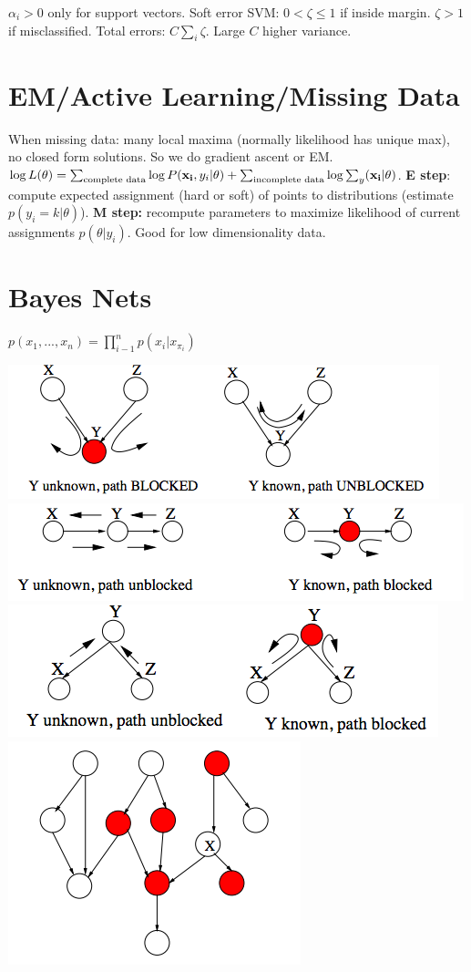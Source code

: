 $\alpha_{i} > 0$ only for support vectors. Soft error SVM: $0 < \zeta \leq 1$ if inside margin. $\zeta > 1$ if misclassified. Total errors: $C \sum_{i} \zeta$. Large $C$ higher variance.

\section{EM/Active Learning/Missing Data}
When missing data: many local maxima (normally likelihood has unique max), no closed form solutions. So we do gradient ascent or EM. $\log L(\theta) = \sum_{\text{complete data}} \log P(\mathbf{x_i}, y_i \vert \theta) + \sum_{\text{incomplete data}} \log \sum_{y} (\mathbf{x_i} \vert \theta)$. {\bf E step}: compute expected assignment (hard or soft) of points to distributions (estimate $p(y_i = k \vert \theta)$). {\bf M step: } recompute parameters to maximize likelihood of current assignments $p(\theta \vert y_i)$. Good for low dimensionality data. 

\section{Bayes Nets}
$p(x_1, ..., x_{n}) = \prod_{i-1}^{n} p(x_i \vert x_{\pi_i})$

\includegraphics[width=0.5\linewidth]{path_1.png}
\includegraphics[width=0.5\linewidth]{path_2.png}
\includegraphics[width=0.5\linewidth]{path_3.png}
\includegraphics[width=0.3\linewidth]{markov_blanket.png}

